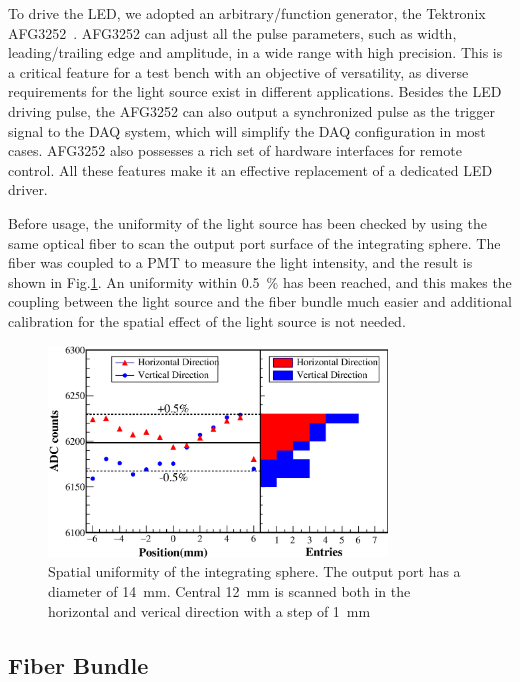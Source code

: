\documentclass[review, times]{elsarticle}
\begin{document}
To drive the LED, we adopted an arbitrary/function generator, the Tektronix AFG3252~\cite{afg3252}. AFG3252 can adjust all the pulse parameters, such as width, leading/trailing edge and amplitude, in a wide range with high precision. This is a critical feature for a test bench with an objective of versatility, as diverse requirements for the light source exist in different applications. 
Besides the LED driving pulse, the AFG3252 can also output a synchronized pulse as the trigger signal to the DAQ system, which will simplify the DAQ configuration in most cases. 
AFG3252 also possesses a rich set of hardware interfaces for remote control. All these features make it an effective replacement of a dedicated LED driver. 

Before usage, the uniformity of the light source has been checked by using the same optical fiber to scan the output port surface of the integrating sphere. The fiber was coupled to a PMT to measure the light intensity, and the result is shown in Fig.\ref{fig:uniformity_integratingsphere}. An uniformity within \textpm\SI{0.5}{\percent} has been reached, and this makes the coupling between the light source and the fiber bundle much easier and additional calibration for the spatial effect of the light source is not needed. 

\begin{figure}
 \centering
 \includegraphics[width=90mm]{uniformity_integratingsphere}
\caption{Spatial uniformity of the integrating sphere.
The output port has a diameter of \SI{14}{\milli\meter}.
Central \SI{12}{\milli\meter} is scanned both in the horizontal and verical direction with a step of \SI{1}{\milli\meter}}
\label{fig:uniformity_integratingsphere}
\end{figure} 

\subsection{Fiber Bundle}
\label{sec:fiber_bundle}
\end{document}
